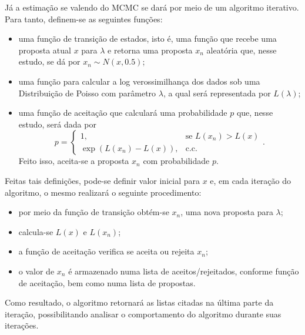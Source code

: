 \documentclass[11pt,letterpaper,twocolumn]{article}
\begin{document}
Já a estimação se valendo do MCMC se dará por meio de um algoritmo iterativo. Para tanto, definem-se as seguintes funções:
\begin{itemize}
    \item
        uma função de transição de estados, isto é, uma função que recebe uma proposta atual $x$ para $\lambda$ e retorna uma proposta $x_n$ aleatória que, nesse estudo, se dá por $x_{n}\sim N(x, 0.5)$;
        
    \item
        uma função para calcular a log verossimilhança dos dados sob uma Distribuição de Poisso com parâmetro $\lambda$, a qual será representada por $L(\lambda)$;
        
    \item
        uma função de aceitação que calculará uma probabilidade $p$ que, nesse estudo, será dada por
        \begin{equation}
            p = 
            \left\{
                \begin{array}{rl}
                    1, & \text{se } L(x_n) > L(x) \\
                    \exp{\left(L(x_n) - L(x)\right)}, & \text{c.c.}
                \end{array}
            \right..
            \label{prob}
        \end{equation}
        Feito isso, aceita-se a proposta $x_n$ com probabilidade $p$.
\end{itemize}

Feitas tais definições, pode-se definir valor inicial para $x$ e, em cada iteração do algoritmo, o mesmo realizará o seguinte procedimento:
\begin{itemize}
    \item
        por meio da função de transição obtém-se $x_n$, uma nova proposta para $\lambda$;
        
    \item
        calcula-se $L(x)$ e $L\left(x_{n}\right)$;
        
    \item
        a função de aceitação verifica se aceita ou rejeita $x_n$;
        
    \item
        o valor de $x_n$ é armazenado numa lista de aceitos/rejeitados, conforme função de aceitação, bem como numa lista de propostas.
\end{itemize}

Como resultado, o algoritmo retornará as listas citadas na última parte da iteração, possibilitando analisar o comportamento do algoritmo durante suas iterações.
\end{document}
